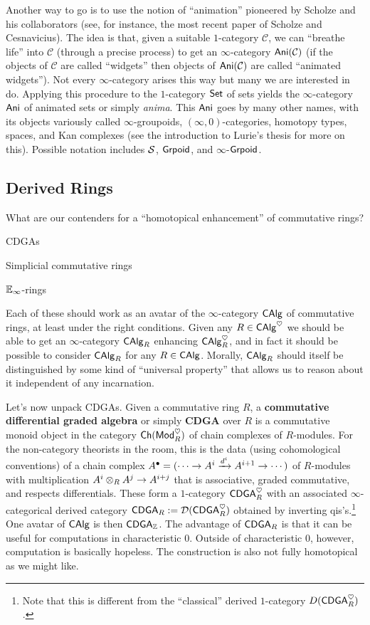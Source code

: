\documentclass[11pt]{article}
\renewcommand{\C}{\mathcal{C}}
\begin{document}
Another way to go is to use the notion of ``animation'' pioneered by Scholze and his collaborators (see, for instance, the most recent paper of Scholze and Cesnavicius). The idea is that, given a suitable $1$-category $\C$, we can ``breathe life'' into $\C$ (through a precise process) to get an $\infty$-category $\Ani(\C)$ (if the objects of $\C$ are called ``widgets'' then objects of $\Ani(\C)$ are called ``animated widgets''). Not every $\infty$-category arises this way but many we are interested in do. Applying this procedure to the $1$-category $\operatorname{\mathsf{Set}}$ of sets yields the $\infty$-category $\operatorname{\mathsf{Ani}}$ of animated sets or simply \emph{anima}. This $\operatorname{\mathsf{Ani}}$ goes by many other names, with its objects variously called $\infty$-groupoids, $(\infty,0)$-categories, homotopy types, spaces, and Kan complexes (see the introduction to Lurie's thesis for more on this). Possible notation includes $\mathcal{S}$, $\operatorname{\mathsf{Grpoid}}$, and $\infty$-$\operatorname{\mathsf{Grpoid}}$.

\subsection{Derived Rings}
What are our contenders for a ``homotopical enhancement'' of commutative rings?
\begin{enum}{\alph}
\item CDGAs
\item Simplicial commutative rings
\item $\mathbb{E}_{\infty}$-rings
\end{enum}
Each of these should work as an avatar of the $\infty$-category $\operatorname{\mathsf{CAlg}}$ of commutative rings, at least under the right conditions. Given any $R\in\operatorname{\mathsf{CAlg}}^{\heartsuit}$ we should be able to get an $\infty$-category $\operatorname{\mathsf{CAlg}}_R$ enhancing $\operatorname{\mathsf{CAlg}}_R^{\heartsuit}$, and in fact it should be possible to consider $\operatorname{\mathsf{CAlg}}_R$ for any $R\in\operatorname{\mathsf{CAlg}}$. Morally, $\operatorname{\mathsf{CAlg}}_R$ should itself be distinguished by some kind of ``universal property'' that allows us to reason about it independent of any incarnation.

Let's now unpack CDGAs. Given a commutative ring $R$, a \textbf{commutative differential graded algebra} or simply \textbf{CDGA} over $R$ is a commutative monoid object in the category $\operatorname{\mathsf{Ch}}(\operatorname{\mathsf{Mod}}_R^{\heartsuit})$ of chain complexes of $R$-modules. For the non-category theorists in the room, this is the data (using cohomological conventions) of a chain complex $A^{\bullet}=(\cdots\to A^i\xrightarrow{d^i}A^{i+1}\to\cdots)$ of $R$-modules with multiplication $A^i\otimes_RA^j\to A^{i+j}$ that is associative, graded commutative, and respects differentials. These form a $1$-category $\operatorname{\mathsf{CDGA}}_R^{\heartsuit}$ with an associated $\infty$-categorical derived category $\operatorname{\mathsf{CDGA}}_R:=\mathcal{D}(\operatorname{\mathsf{CDGA}}_R^{\heartsuit})$ obtained by inverting qis's.\footnote{Note that this is different from the ``classical'' derived $1$-category $D(\operatorname{\mathsf{CDGA}}_R^{\heartsuit})$.} One avatar of $\operatorname{\mathsf{CAlg}}$ is then $\operatorname{\mathsf{CDGA}}_{\mathbb{Z}}$. The advantage of $\operatorname{\mathsf{CDGA}}_R$ is that it can be useful for computations in characteristic $0$. Outside of characteristic $0$, however, computation is basically hopeless. The construction is also not fully homotopical as we might like.
\end{document}
